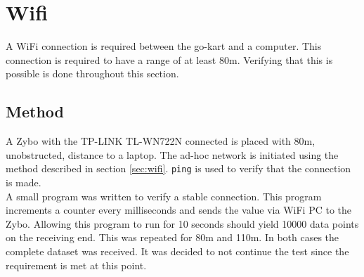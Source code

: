 \section{Wifi}
A WiFi connection is required between the go-kart and a computer.
This connection is required to have a range of at least 80\si{\metre}.
Verifying that this is possible is done throughout this section.

\subsection{Method}
A Zybo with the TP-LINK TL-WN722N connected is placed with 80\si{\metre}, unobstructed, distance to a laptop.
The ad-hoc network is initiated using the method described in section \ref{sec:wifi}.
\texttt{ping} is used to verify that the connection is made.\\
A small program was written to verify a stable connection.
This program increments a counter every milliseconds and sends the value via WiFi PC to the Zybo.
Allowing this program to run for 10 seconds should yield 10000 data points on the receiving end.
This was repeated for 80\si{\metre} and 110\si{\metre}.
In both cases the complete dataset was received.
It was decided to not continue the test since the requirement is met at this point.
